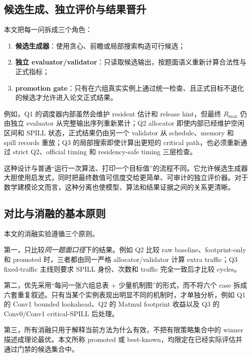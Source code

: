 \subsection{候选生成、独立评价与结果晋升}

本文把每一问拆成三个角色：
\begin{enumerate}[label=(\arabic*)]
    \item \textbf{候选生成器}：使用贪心、前瞻或局部搜索构造可行候选；
    \item \textbf{独立 evaluator/validator}：只读取候选输出，按题面语义重新计算合法性与正式指标；
    \item \textbf{promotion gate}：只有在六组真实实例上通过统一检查、且正式目标不退化的候选才允许进入论文正式结果。
\end{enumerate}

例如，Q1 的调度器内部虽然会维护 resident 估计和 release hint，但最终 $R_{\max}$ 仍由独立 evaluator 从完整输出序列重新累计；Q2 allocator 即使内部已经维护空闲区间和 SPILL 状态，正式结果仍由另一个 validator 从 schedule、memory 和 spill records 重放；Q3 的局部搜索即使计算出更短的 critical path，也必须重新通过 strict Q2、official timing 和 residency-safe timing 三层检查。

这种设计与普通“运行一次算法、打印一个目标值”的流程不同。它允许候选生成器大胆使用启发式，同时把最终数值可信度交给更简单、可审计的独立评价器。对于数学建模论文而言，这种分离也使模型、算法和结果证据之间的关系更清晰。

\subsection{对比与消融的基本原则}

本文的消融实验遵循三个原则。

第一，只比较\emph{同一题面口径}下的结果。例如 Q2 比较 raw baseline、footprint-only 和 promoted 时，三者都由同一严格 allocator/validator 计算 extra traffic；Q3 fixed-traffic 主线则要求 SPILL 身份、次数和 traffic 完全一致后才比较 cycles。

第二，优先采用“每问一张六组总表 + 少量机制图”的形式，而不将六个 case 拆成六套重复叙述。只有当某个实例表现出明显不同的机制时，才单独分析，例如 Q1 的 Conv1 bounded lookahead、Q2 的 Matmul footprint 收益以及 Q3 的 Conv0/Conv1 critical-SPILL 后处理。

第三，所有消融只用于解释当前方法为什么有效，不把有限策略集合中的 winner 描述成理论最优。本文所称 promoted 或 best-known，均限定在已经实际评估并通过门禁的候选集合中。
